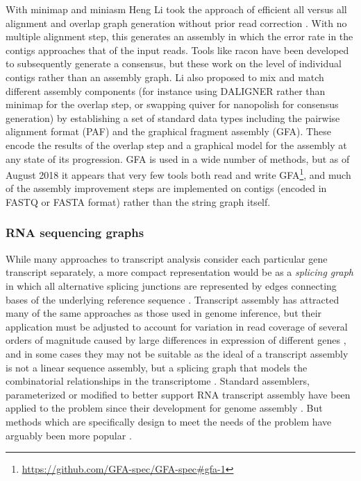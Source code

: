 With minimap and miniasm Heng Li took the approach of efficient all versus all alignment and overlap graph generation without prior read correction \cite{li2016minimap}.
With no multiple alignment step, this generates an assembly in which the error rate in the contigs approaches that of the input reads.
Tools like racon \cite{vaser2017fast} have been developed to subsequently generate a consensus, but these work on the level of individual contigs rather than an assembly graph.
Li \cite{li2016minimap} also proposed to mix and match different assembly components (for instance using DALIGNER \cite{myers2014efficient} rather than minimap for the overlap step, or swapping quiver for nanopolish for consensus generation) by establishing a set of standard data types including the pairwise alignment format (PAF) and the graphical fragment assembly (GFA).
These encode the results of the overlap step and a graphical model for the assembly at any state of its progression.
GFA is used in a wide number of methods, but as of August 2018 it appears that very few tools both read and write GFA\footnote{\url{https://github.com/GFA-spec/GFA-spec\#gfa-1}}, and much of the assembly improvement steps are implemented on contigs (encoded in FASTQ or FASTA format) rather than the string graph itself.


\subsubsection{RNA sequencing graphs}
\label{sec:rna_seq}

While many approaches to transcript analysis consider each particular gene transcript separately, a more compact representation would be as a \emph{splicing graph} in which all alternative splicing junctions are represented by edges connecting bases of the underlying reference sequence \cite{heber2002splicing,lee2002POA}.
Transcript assembly has attracted many of the same approaches as those used in genome inference, but their application must be adjusted to account for variation in read coverage of several orders of magnitude caused by large differences in expression of different genes \cite{martin2011next}, and in some cases they may not be suitable as the ideal of a transcript assembly is not a linear sequence assembly, but a splicing graph that models the combinatorial relationships in the transcriptome \cite{grabherr2011full}.
Standard assemblers, parameterized or modified to better support RNA transcript assembly have been applied to the problem since their development for genome assembly \cite{birol2009novo,robertson2010novo,schulz2012oases}.
But methods which are specifically design to meet the needs of the problem have arguably been more popular \cite{grabherr2011full,chang2015bridger}.

